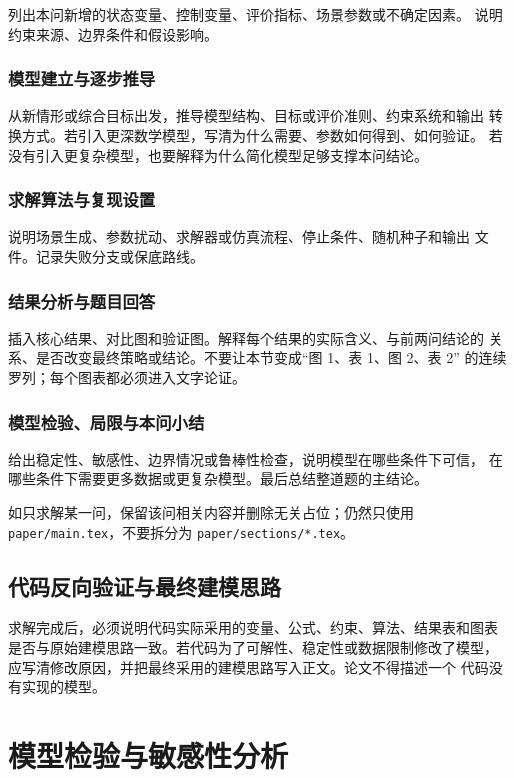 \documentclass[12pt,a4paper]{ctexart}
\begin{document}
列出本问新增的状态变量、控制变量、评价指标、场景参数或不确定因素。
说明约束来源、边界条件和假设影响。

\subsubsection{模型建立与逐步推导}

从新情形或综合目标出发，推导模型结构、目标或评价准则、约束系统和输出
转换方式。若引入更深数学模型，写清为什么需要、参数如何得到、如何验证。
若没有引入更复杂模型，也要解释为什么简化模型足够支撑本问结论。

\subsubsection{求解算法与复现设置}

说明场景生成、参数扰动、求解器或仿真流程、停止条件、随机种子和输出
文件。记录失败分支或保底路线。

\subsubsection{结果分析与题目回答}

插入核心结果、对比图和验证图。解释每个结果的实际含义、与前两问结论的
关系、是否改变最终策略或结论。不要让本节变成“图 1、表 1、图 2、表 2”
的连续罗列；每个图表都必须进入文字论证。

\subsubsection{模型检验、局限与本问小结}

给出稳定性、敏感性、边界情况或鲁棒性检查，说明模型在哪些条件下可信，
在哪些条件下需要更多数据或更复杂模型。最后总结整道题的主结论。

如只求解某一问，保留该问相关内容并删除无关占位；仍然只使用
\verb|paper/main.tex|，不要拆分为 \verb|paper/sections/*.tex|。

\subsection{代码反向验证与最终建模思路}

求解完成后，必须说明代码实际采用的变量、公式、约束、算法、结果表和图表
是否与原始建模思路一致。若代码为了可解性、稳定性或数据限制修改了模型，
应写清修改原因，并把最终采用的建模思路写入正文。论文不得描述一个
代码没有实现的模型。

\section{模型检验与敏感性分析}
\end{document}
